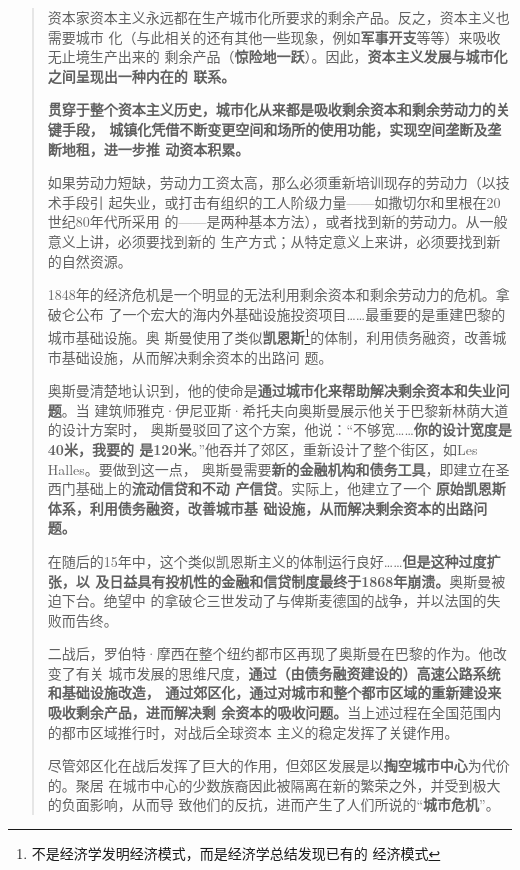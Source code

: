 \begin{quotation}
  资本家资本主义永远都在生产城市化所要求的剩余产品。反之，资本主义也需要城市
  化（与此相关的还有其他一些现象，例如\textbf{军事开支}等等）来吸收无止境生产出来的
  剩余产品（\textbf{惊险地一跃}）。因此，\textbf{资本主义发展与城市化之间呈现出一种内在的
    联系。}

  \textbf{贯穿于整个资本主义历史，城市化从来都是吸收剩余资本和剩余劳动力的关键手段，
    城镇化凭借不断变更空间和场所的使用功能，实现空间垄断及垄断地租，进一步推
    动资本积累。}

  如果劳动力短缺，劳动力工资太高，那么必须重新培训现存的劳动力（以技术手段引
  起失业，或打击有组织的工人阶级力量——如撒切尔和里根在20世纪80年代所采用
  的——是两种基本方法），或者找到新的劳动力。从一般意义上讲，必须要找到新的
  生产方式；从特定意义上来讲，必须要找到新的自然资源。

  1848年的经济危机是一个明显的无法利用剩余资本和剩余劳动力的危机。拿破仑公布
  了一个宏大的海内外基础设施投资项目……最重要的是重建巴黎的城市基础设施。奥
  斯曼使用了类似\textbf{凯恩斯}\footnote{不是经济学发明经济模式，而是经济学总结发现已有的
    经济模式}的体制，利用债务融资，改善城市基础设施，从而解决剩余资本的出路问
  题。

  奥斯曼清楚地认识到，他的使命是\textbf{通过城市化来帮助解决剩余资本和失业问题}。当
  建筑师雅克·伊尼亚斯·希托夫向奥斯曼展示他关于巴黎新林荫大道的设计方案时，
  奥斯曼驳回了这个方案，他说：“不够宽……\textbf{你的设计宽度是40米，我要的
    是120米}。”他吞并了郊区，重新设计了整个街区，如Les Halles。要做到这一点，
  奥斯曼需要\textbf{新的金融机构和债务工具}，即建立在圣西门基础上的\textbf{流动信贷和不动
    产信贷}。实际上，他建立了一个 \textbf{原始凯恩斯体系，利用债务融资，改善城市基
    础设施，从而解决剩余资本的出路问题。}

  在随后的15年中，这个类似凯恩斯主义的体制运行良好……\textbf{但是这种过度扩张，以
    及日益具有投机性的金融和信贷制度最终于1868年崩溃。}奥斯曼被迫下台。绝望中
  的拿破仑三世发动了与俾斯麦德国的战争，并以法国的失败而告终。

  二战后，罗伯特·摩西在整个纽约都市区再现了奥斯曼在巴黎的作为。他改变了有关
  城市发展的思维尺度，\textbf{通过（由债务融资建设的）高速公路系统和基础设施改造，
    通过郊区化，通过对城市和整个都市区域的重新建设来吸收剩余产品，进而解决剩
    余资本的吸收问题。}当上述过程在全国范围内的都市区域推行时，对战后全球资本
  主义的稳定发挥了关键作用。

  尽管郊区化在战后发挥了巨大的作用，但郊区发展是以\textbf{掏空城市中心}为代价的。聚居
  在城市中心的少数族裔因此被隔离在新的繁荣之外，并受到极大的负面影响，从而导
  致他们的反抗，进而产生了人们所说的“\textbf{城市危机}”。


\end{quotation}
